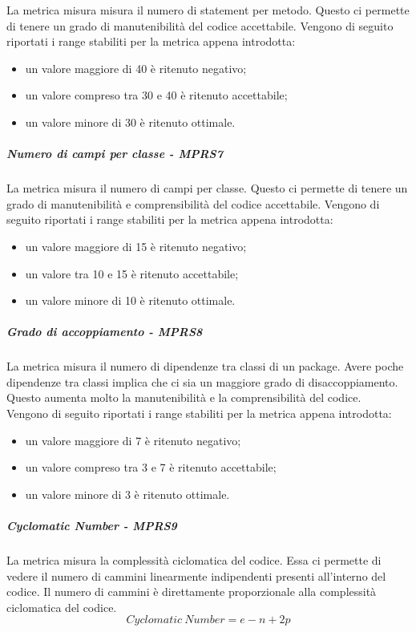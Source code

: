 \documentclass[../PianoDiQualifica.tex]{subfiles}
\begin{document}
			La metrica misura misura il numero di statement per metodo. Questo ci permette di tenere un grado di manutenibilità del codice accettabile.
			Vengono di seguito riportati i range stabiliti per la metrica appena introdotta:
			\begin{itemize}
				\item un valore maggiore di 40 è ritenuto negativo;
				\item un valore compreso tra 30 e 40 è ritenuto accettabile;
				\item un valore minore di 30 è ritenuto ottimale.
			\end{itemize}
			\subparagraph{Numero di campi per classe - MPRS7}\label{MPRS7}
			La metrica misura il numero di campi per classe. Questo ci permette di tenere un grado di manutenibilità e comprensibilità del codice accettabile.
			Vengono di seguito riportati i range stabiliti per la metrica appena introdotta:
			\begin{itemize}
			\item un valore maggiore di 15 è ritenuto negativo;
			\item un valore tra 10 e 15 è ritenuto accettabile;
			\item un valore minore di 10 è ritenuto ottimale.
			\end{itemize}
			\subparagraph{Grado di accoppiamento - MPRS8}\label{MPRS8}
			La metrica misura il numero di dipendenze tra classi di un package\g. Avere poche dipendenze tra classi implica che ci sia un maggiore grado di disaccoppiamento. Questo aumenta molto la manutenibilità e la comprensibilità del codice.\\
			Vengono di seguito riportati i range stabiliti per la metrica appena introdotta:
			\begin{itemize}
				\item un valore maggiore di 7 è ritenuto negativo;
				\item un valore compreso tra 3 e 7 è ritenuto accettabile;
				\item un valore minore di 3 è ritenuto ottimale.
			\end{itemize}
			\subparagraph{Cyclomatic Number - MPRS9}\label{MPRS9}
			La metrica misura la complessità ciclomatica del codice. Essa ci permette di vedere il numero di cammini linearmente indipendenti presenti all'interno del codice. Il numero di cammini è direttamente proporzionale alla complessità ciclomatica del codice.
			\begin{equation}
			Cyclomatic \ Number = e - n + 2p 
			\end{equation}
\end{document}
